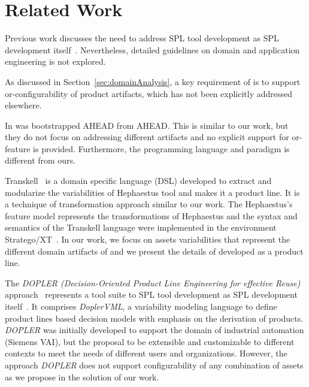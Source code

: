 \section{Related Work}
\label{related-work}


Previous work discusses the need to address SPL tool development as SPL development itself~\citep{grunbacher:2008}. Nevertheless, detailed guidelines on domain and application engineering is not explored.

As discussed in Section~\ref{sec:domainAnalysis}, a key requirement of \hpl{} is to support or-configurability of product artifacts, which has not been explicitly addressed elsewhere.

In \citep{batory-ahead-bootstrap} was bootstrapped AHEAD from AHEAD. This is similar to our work, but they do not focus on addressing different artifacts and no explicit support for or-feature is provided. Furthermore, the programming language and paradigm is different from ours.

Transkell~\citep{marcos:2010} is a domain specific language (DSL) developed to extract and modularize the variabilities of Hephaestus tool and makes it a product line. It is a technique of transformation approach similar to our work.
The Hephaestus’s feature model represents the transformations of Hephaestus and the syntax and semantics of the Transkell language were implemented in the environment Stratego/XT~\citep{visser:2003}. In our work, we focus on assets variabilities that represent the different domain artifacts of \hp{} and we present the details of \hpl{} developed as a product line. 

The \textit{DOPLER (Decision-Oriented Product Line Engineering for effective Reuse)} approach~\citep{DBLP:journals/ase/DhunganaGR11} represents a tool suite to SPL tool development as SPL development itself~\citep{grunbacher:2008}. It comprises \textit{DoplerVML}, a variability modeling language to define product lines based decision models with emphasis on the derivation of products.
\textit{DOPLER} was initially developed to support the domain of industrial automation (Siemens VAI), but the proposal to be extensible and customizable to different contexts to meet the needs of different users and organizations.
However, the approach \textit{DOPLER}  does not support configurability of any combination of assets as we propose in the solution of our work.

